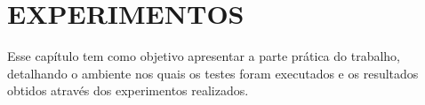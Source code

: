 \chapter{EXPERIMENTOS} \label{cha:experimentos}

Esse capítulo tem como objetivo apresentar a parte prática do trabalho, detalhando o ambiente nos quais os testes foram executados e os resultados obtidos através dos experimentos realizados.


